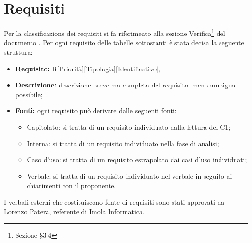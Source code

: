 \section{Requisiti}
Per la classificazione dei requisiti si fa riferimento alla sezione Verifica\footnote{Sezione §3.4} del documento .
Per ogni requisito delle tabelle sottostanti è stata decisa la seguente struttura: 
\begin{itemize}
\item\textbf{Requisito:} R[Priorità][Tipologia][Identificativo];
\item\textbf{Descrizione:} descrizione breve ma completa del requisito, meno ambigua possibile;
\item\textbf{Fonti:} ogni requisito può derivare dalle seguenti fonti:
	\begin{itemize}
		\item Capitolato: si tratta di un requisito individuato dalla lettura del C1;
		\item Interna: si tratta di un requisito individuato nella fase di analisi;
		\item Caso d'uso: si tratta di un requisito estrapolato dai casi d'uso individuati;
		\item Verbale: si tratta di un requisito individuato nel verbale in seguito ai chiarimenti con il proponente.
	\end{itemize}
\end{itemize}
I verbali esterni che costituiscono fonte di requisiti sono stati approvati da Lorenzo Patera, referente di Imola Informatica.



